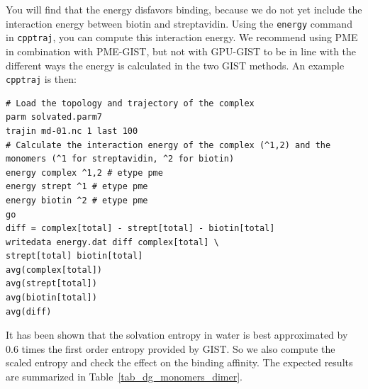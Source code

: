 \documentclass[9pt,tutorial]{livecoms}
\newcommand{\software}{\texttt}
\newcommand\inlinecode{\texttt}
\begin{document}
You will find that the energy disfavors binding, because we do not yet include the interaction energy between biotin and streptavidin.
Using the \inlinecode{energy} command in \software{cpptraj}, you can compute this interaction energy.
We recommend using PME in combination with PME-GIST, but not with GPU-GIST to be in line with the different ways the energy is calculated in the two GIST methods.
An example \software{cpptraj} is then:
\begin{lstlisting}[style=cpptraj]
# Load the topology and trajectory of the complex
parm solvated.parm7
trajin md-01.nc 1 last 100
# Calculate the interaction energy of the complex (^1,2) and the monomers (^1 for streptavidin, ^2 for biotin)
energy complex ^1,2 # etype pme
energy strept ^1 # etype pme
energy biotin ^2 # etype pme
go
diff = complex[total] - strept[total] - biotin[total]
writedata energy.dat diff complex[total] \
strept[total] biotin[total]
avg(complex[total])
avg(strept[total])
avg(biotin[total])
avg(diff)
\end{lstlisting}
It has been shown \cite{Chen2021,Waibl2022-gist-solvents} that the solvation entropy in water is best approximated by 0.6 times the first order entropy provided by GIST.
So we also compute the scaled entropy and check the effect on the binding affinity.
The expected results are summarized in Table~\ref{tab_dg_monomers_dimer}.
\end{document}
